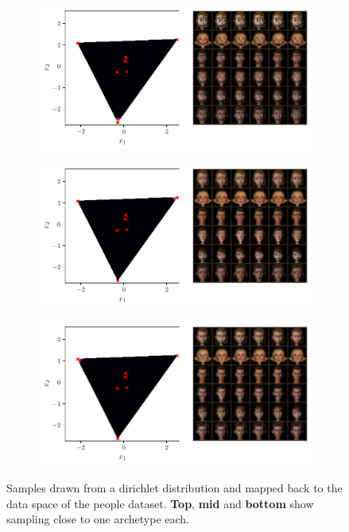 \begin{figure}[htpb]
	\centering
	\begin{subfigure}[htpb]{\textwidth}
		\centering
		\includegraphics[width=1\linewidth]{figures/samples/aa_ferg1.pdf}
	\end{subfigure}

	\begin{subfigure}[htpb]{\textwidth}
		\centering
		\includegraphics[width=1\linewidth]{figures/samples/aa_ferg2.pdf}
	\end{subfigure}

	\begin{subfigure}[htpb]{\textwidth}
		\centering
		\includegraphics[width=1\linewidth]{figures/samples/aa_ferg3.pdf}
	\end{subfigure}

	\caption{Samples drawn from a dirichlet distribution and mapped back to
		the data space of the people dataset. \textbf{Top}, \textbf{mid}
                and \textbf{bottom} show
		sampling close to one archetype each.}%
	\label{fig:aa_ferg_corners}
\end{figure}

